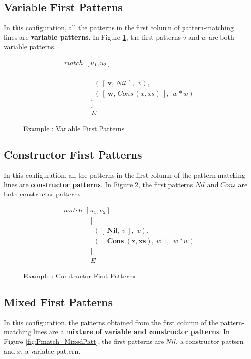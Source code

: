 \documentclass[11pt]{article}
\begin{document}
\subsection{Variable First Patterns}
In this configuration, all the patterns in the first column of pattern-matching lines are {\bf variable patterns}. In Figure \ref {fig:Pmatch_AllVars}, the first patterns $v$ and $w$ are both variable patterns.
    \begin{figure}[!h]
    \begin{align*} 
    &match~~[u_1,u_2] \\
    &\qquad\qquad [\\
    &\qquad\qquad ~~(~[~\mathbf{v},~Nil~],~~v), \\
    &\qquad\qquad ~~(~[~\mathbf{w},~Cons~(x,xs)~],~~w*w) \\
    &\qquad\qquad ]\\
    &\qquad\qquad E
    \end{align*} 
    \caption{Example : Variable First Patterns} \label{fig:Pmatch_AllVars}
    \end{figure}
\subsection{Constructor First Patterns}
  In this configuration, all the patterns in the first column of the pattern-matching lines are {\bf constructor patterns}. In Figure \ref {fig:Pmatch_AllCons}, the first patterns $Nil$ and $Cons$ are both constructor patterns.
    
    \begin{figure}[!h]
    \begin{align*} 
    &match~~[u_1,u_2] \\
    &\qquad\qquad [\\
    &\qquad\qquad ~~(~[~\mathbf{Nil},~v~],~~v), \\
    &\qquad\qquad ~~(~[~\mathbf{Cons~(x,xs)},~w~],~~w*w) \\
    &\qquad\qquad ]\\
    &\qquad\qquad E
    \end{align*} 
    \caption{Example : Constructor First Patterns} \label{fig:Pmatch_AllCons}
    \end{figure}

\subsection{Mixed First Patterns}
  In this configuration, the patterns obtained from the first column of the pattern-matching lines are a {\bf mixture of variable and constructor patterns}. In Figure \ref {fig:Pmatch_MixedPatt}, the first patterns are $Nil$, a constructor pattern and $x$, a variable pattern. 
\end{document}
